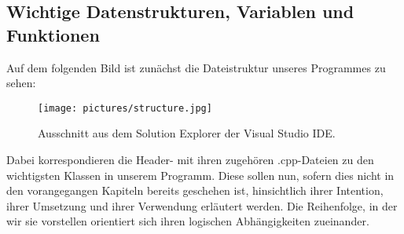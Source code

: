 	\subsection{Wichtige Datenstrukturen, Variablen und Funktionen}\label{sec:ds}
	Auf dem folgenden Bild ist zunächst die Dateistruktur unseres Programmes zu sehen:
	\begin{figure}[h]
	\centering
	\texttt{[image: pictures/structure.jpg]}
	\caption{Ausschnitt aus dem Solution Explorer der Visual Studio IDE.}
	\end{figure}
	Dabei korrespondieren die Header- mit ihren zugehören .cpp-Dateien zu den wichtigsten Klassen in unserem Programm. Diese sollen nun, sofern dies nicht in den vorangegangen Kapiteln bereits geschehen ist, hinsichtlich ihrer Intention, ihrer Umsetzung und ihrer Verwendung erläutert werden. Die Reihenfolge, in der wir sie vorstellen orientiert sich ihren logischen Abhängigkeiten zueinander.\par\medskip
